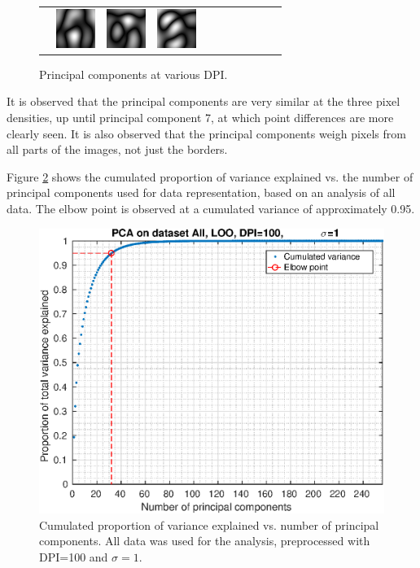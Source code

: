 \begin{figure}[ht]
\begin{tabular}{r*{10}{c}}
 & \includegraphics[width=\smallfigscale]{img/pca-All-dpi300-sigma4-pc8} 
 & \includegraphics[width=\smallfigscale]{img/pca-All-dpi300-sigma4-pc9} 
 & \includegraphics[width=\smallfigscale]{img/pca-All-dpi300-sigma4-pc10} 
\end{tabular}
\caption[Principal components at various DPI.]
{Principal components at various DPI.}
\label{fig:principal-components}
\end{figure}

It is observed that the principal components are very similar
at the three pixel densities, up until principal component 7,
at which point differences are more clearly seen.
It is also observed that the principal components
weigh pixels from all parts of the images, not just the borders.

Figure \ref{fig:pca-cumvar} shows the cumulated proportion of variance
explained vs. the number of principal components used for data representation,
based on an analysis of all data.
The elbow point is observed at a cumulated variance of approximately 0.95.
\begin{figure}[ht]
\centering
\includegraphics[width=\figscale]{img/pca-All-cumvar-dpi100-sigma1}
\caption[Cumulated variance explained by PCA]
{Cumulated proportion of variance explained vs. number of principal components.
All data was used for the analysis, preprocessed with DPI=100 and \(\sigma=1\).}
\label{fig:pca-cumvar}
\end{figure}

